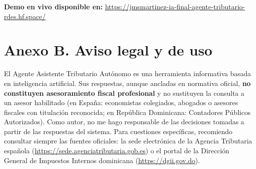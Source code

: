 \documentclass[11pt,a4paper]{article}
\begin{document}
\textbf{Demo en vivo disponible en:} \url{https://jmsmartinez-ia-final-agente-tributario-rdes.hf.space/}

\section*{Anexo B. Aviso legal y de uso}

El Agente Asistente Tributario Autónomo es una herramienta informativa basada en inteligencia artificial. Sus respuestas, aunque ancladas en normativa oficial, \textbf{no constituyen asesoramiento fiscal profesional} y no sustituyen la consulta a un asesor habilitado (en España: economistas colegiados, abogados o asesores fiscales con titulación reconocida; en República Dominicana: Contadores Públicos Autorizados). Como autor, no me hago responsable de las decisiones tomadas a partir de las respuestas del sistema. Para cuestiones específicas, recomiendo consultar siempre las fuentes oficiales: la sede electrónica de la Agencia Tributaria española (\url{https://sede.agenciatributaria.gob.es}) o el portal de la Dirección General de Impuestos Internos dominicana (\url{https://dgii.gov.do}).
\end{document}
